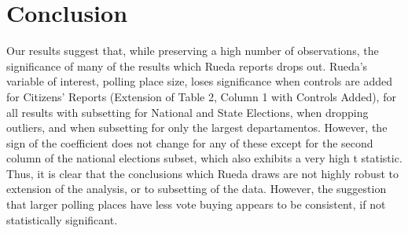 \documentclass[12pt]{article}
\begin{document}
\FloatBarrier
\begin{table}[]
    \caption*{Extension of Tables 2 and 3 Subsetted to Only the Six Largest Departmentos}
 \singlespacing   
    \centering
{    
}
\end{table}



\newpage
\section{Conclusion}
Our results suggest that, while preserving a high number of observations, the significance of many of the results which Rueda reports drops out. Rueda's variable of interest, polling place size, loses significance when controls are added for Citizens' Reports (Extension of Table 2, Column 1 with Controls Added), for all results with subsetting for National and State Elections, when dropping outliers, and when subsetting for only the largest departamentos. However, the sign of the coefficient does not change for any of these except for the second column of the national elections subset, which also exhibits a very high t statistic. Thus, it is clear that the conclusions which Rueda draws are not highly robust to extension of the analysis, or to subsetting of the data. However, the suggestion that larger polling places have less vote buying appears to be consistent, if not statistically significant.
\end{document}
